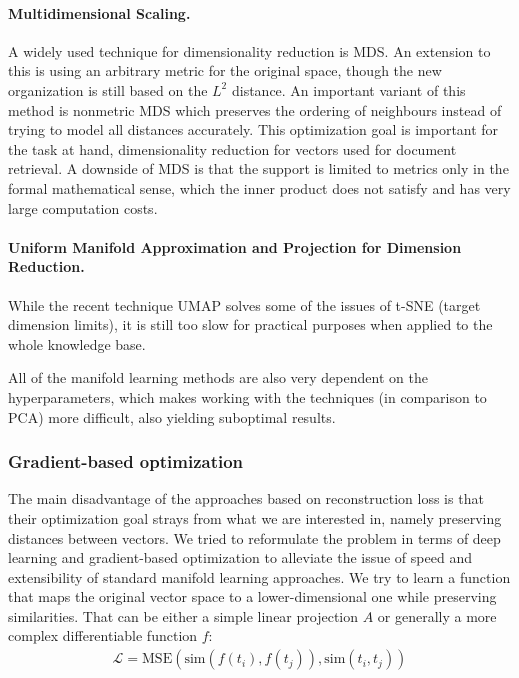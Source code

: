 \paragraph{Multidimensional Scaling.}
A widely used technique for dimensionality reduction is MDS.
An extension to this is using an arbitrary metric for the original space, though the new organization is still based on the $L^2$ distance.
An important variant of this method is nonmetric MDS which preserves the ordering of neighbours instead of trying to model all distances accurately.
This optimization goal is important for the task at hand, dimensionality reduction for vectors used for document retrieval.
A downside of MDS is that the support is limited to metrics only in the formal mathematical sense, which the inner product does not satisfy and has very large computation costs.

\paragraph{Uniform Manifold Approximation and Projection for Dimension Reduction.}

While the recent technique UMAP \citep{mcinnes2018umap} solves some of the issues of t-SNE (target dimension limits), it is still too slow for practical purposes when applied to the whole knowledge base.

All of the manifold learning methods are also very dependent on the hyperparameters, which makes working with the techniques (in comparison to PCA) more difficult, also yielding suboptimal results.

\subsubsection{Gradient-based optimization}

The main disadvantage of the approaches based on reconstruction loss is that their optimization goal strays from what we are interested in, namely preserving distances between vectors.
We tried to reformulate the problem in terms of deep learning and gradient-based optimization to alleviate the issue of speed and extensibility of standard manifold learning approaches.
We try to learn a function that maps the original vector space to a lower-dimensional one while preserving similarities.
That can be either a simple linear projection $A$ or generally a more complex differentiable function $f$:
\begin{gather*}
\mathcal{L}=\text{MSE}(\text{sim}(f(t_i), f(t_j)), \text{sim}(t_i, t_j))
\end{gather*}

